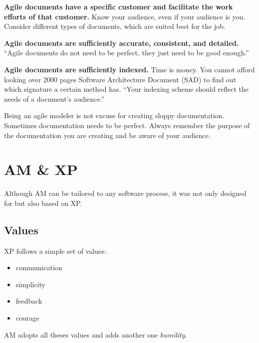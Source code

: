 \begin{description}
\item {\bf Agile documents have a specific customer and facilitate the work
efforts of that customer.} Know your audience, even if your audience is you.
Consider different types of documents, which are suited best for the job.
\item {\bf Agile documents are sufficiently accurate, consistent, and detailed.}
\enquote{Agile documents do not need to be perfect, they just need to be good
enough.}\cite{Ambler200204}
\item {\bf Agile documents are sufficiently indexed.} Time is money. You cannot
afford looking over 2000 pages Software Architecture Document (SAD) to find out
which signature a certain method has. \enquote{Your indexing scheme
should reflect the needs of a document's audience.}\cite{Ambler200204}
\end{description}
Being an agile modeler is not excuse for creating sloppy documentation.
Sometimes documentation needs to be perfect. Always remember the purpose of the
documentation you are creating and be aware of your audience.

\section{AM \& XP}
Although AM can be tailored to any software process, it was not only designed
for but also based on XP. 
\subsection{Values}
XP follows a simple set of values:
\begin{itemize}
  \item communication
  \item simplicity
  \item feedback
  \item courage\cite{BeckAndres200411}
\end{itemize}
AM adopts all theses values and adds another one \emph{humility}.
